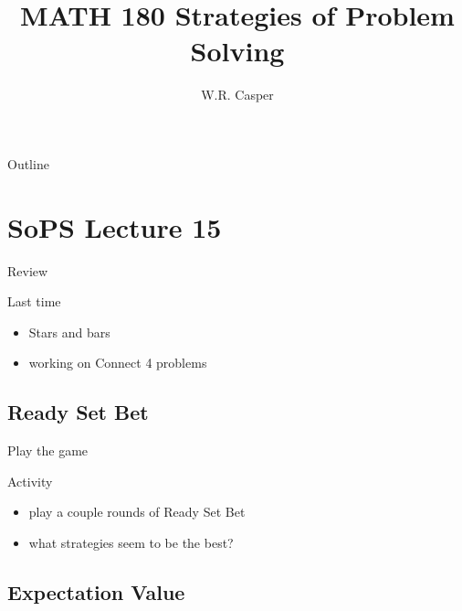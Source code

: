 \documentclass{beamer}
\title{MATH 180 Strategies of Problem Solving}
\subtitle
{} %
\author[W.R. Casper] %
{W.R. Casper}
\institute[California State University Fullerton] %
{
  Department of Mathematics\\
  California State University Fullerton}
\begin{document}
\begin{frame}
  \titlepage
\end{frame}

\begin{frame}{Outline}
  \tableofcontents
\end{frame}



\section{SoPS Lecture 15}

\begin{frame}{Review}
  \begin{block}{Last time}
    \begin{itemize}
\pause
      \item Stars and bars
\pause
      \item working on Connect 4 problems
    \end{itemize}
  \end{block}
\end{frame}

\subsection{Ready Set Bet}

\begin{frame}{Play the game}
  \begin{block}{Activity}
    \begin{itemize}
\pause
      \item play a couple rounds of Ready Set Bet
\pause
      \item what strategies seem to be the best?
    \end{itemize}
  \end{block}
\end{frame}

\subsection{Expectation Value}
\end{document}
